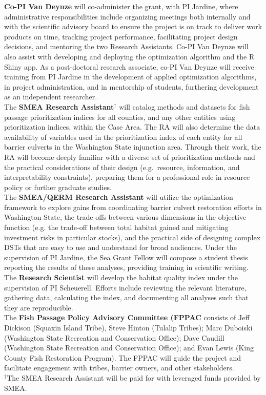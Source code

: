 \textbf{Co-PI Van Deynze} will co-administer the grant, with PI Jardine, where administrative responsibilities include organizing meetings both internally and with the scientific advisory board to ensure the project is on track to deliver work products on time, tracking project performance, facilitating project design decisions, and mentoring the two Research Assistants. Co-PI Van Deynze will also assist with developing and deploying the optimization algorithm and the R Shiny app. As a post-doctoral research associate, co-PI Van Deynze will receive training from PI Jardine in the development of applied optimization algorithms, in project administration, and in mentorship of students, furthering development as an independent researcher. \\

The \textbf{SMEA Research Assistant$^\dagger$} will catalog methods and datasets for fish passage prioritization indices for all counties, and any other entities using prioritization indices, within the Case Area. The RA will also determine the data availability of variables used in the prioritization index of each entity for all barrier culverts in the Washington State injunction area. Through their work, the RA will become deeply familiar with a diverse set of prioritization methods and the practical considerations of their design (e.g.\ resource, information, and interpretability constraints), preparing them for a professional role in resource policy or further graduate studies. \\

The \textbf{SMEA/QERM Research Assistant} will utilize the optimization framework to explore gains from coordinating barrier culvert restoration efforts in Washington State, the trade-offs between various dimensions in the objective function (e.g. the trade-off between total habitat gained and mitigating investment risks in particular stocks), and the practical side of designing complex DSTs that are easy to use and understand for broad audiences. Under the supervision of PI Jardine, the Sea Grant Fellow will compose a student thesis reporting the results of these analyses, providing training in scientific writing. \\

The \textbf{Research Scientist} will develop the habitat quality index under the supervision of PI Scheuerell. Efforts include reviewing the relevant literature, gathering data, calculating the index, and documenting all analyses such that they are reproducible.\\


The \textbf{Fish Passage Policy Advisory Committee (FPPAC} consists of Jeff Dickison (Squaxin Island Tribe), Steve Hinton (Tulalip Tribes); Marc Duboiski (Washington State Recreation and Conservation Office); Dave Caudill (Washington State Recreation and Conservation Office); and Evan Lewis (King County Fish Restoration Program). The FPPAC will guide the project and facilitate engagement with tribes, barrier owners, and other stakeholders.\\


\noindent $^\dagger$The SMEA Research Assistant will be paid for with leveraged funds provided by SMEA.
